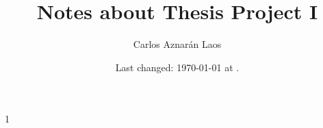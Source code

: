 \usepackage{mathtools}
\usepackage[ISO]{diffcoeff}
\usepackage[useregional]{datetime2}
\usepackage[
]{biblatex}


\providecommand{\continuous}{C\left(\interval\right)}
\providecommand{\interval}{\left[a,b\right]}
\providecommand{\openinterval}{\left(a,b\right)}
\providecommand{\nodalset}{X={\left\{x_{i}\right\}}_{i=0}^{n}}
\providecommand{\concentration}{u\left(x,t\right)}
\providecommand{\averageconcentration}{\overline{u}\left(x,t\right)}








\author{Carlos Aznarán Laos}
\title{Notes about Thesis Project I}

\def\Book{1}
\Book
\else
\fi

\date{
	Last changed: \today{} at \DTMcurrenttime.
}
